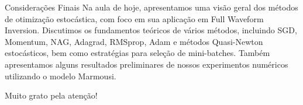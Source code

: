 \documentclass[aspectratio=1610]{beamer}
\newcommand{\tchau}{\vfill \begin{mybox}{}{\begin{center}Muito grato pela atenção!\end{center}} \end{mybox}}
\begin{document}
\begin{frame}{Considerações Finais}
Na aula de hoje, apresentamos uma visão geral dos métodos de otimização estocástica, com foco em sua aplicação em Full Waveform Inversion. Discutimos os fundamentos teóricos de vários métodos, incluindo SGD, Momentum, NAG, Adagrad, RMSprop, Adam e métodos Quasi-Newton estocásticos, bem como estratégias para seleção de mini-batches. Também apresentamos alguns resultados preliminares de nossos experimentos numéricos utilizando o modelo Marmousi.

\tchau
\end{frame}
\end{document}
